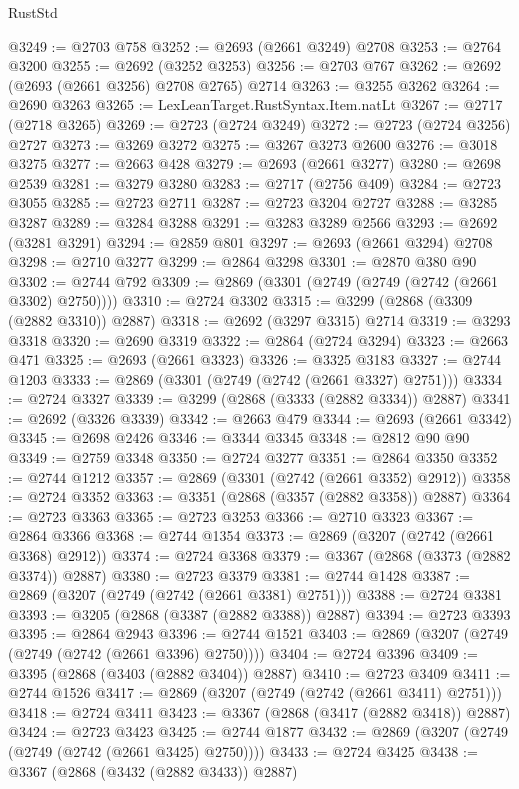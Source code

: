 \begin{lexlean}{RustStd}
\begin{coremodule}
{\begin{coremodule}
{{{{{{{{{{{{{{{{{{{{{{{{{{{{{{{{{{{{{{{@3249 := @2703 @758
@3252 := @2693 (@2661 @3249) @2708
@3253 := @2764 @3200
@3255 := @2692 (@3252 @3253)
@3256 := @2703 @767
@3262 := @2692 (@2693 (@2661 @3256) @2708 @2765) @2714
@3263 := @3255 @3262
@3264 := @2690 @3263
@3265 := LexLeanTarget.RustSyntax.Item.natLt
@3267 := @2717 (@2718 @3265)
@3269 := @2723 (@2724 @3249)
@3272 := @2723 (@2724 @3256) @2727
@3273 := @3269 @3272
@3275 := @3267 @3273 @2600
@3276 := @3018 @3275
@3277 := @2663 @428
@3279 := @2693 (@2661 @3277)
@3280 := @2698 @2539
@3281 := @3279 @3280
@3283 := @2717 (@2756 @409)
@3284 := @2723 @3055
@3285 := @2723 @2711
@3287 := @2723 @3204 @2727
@3288 := @3285 @3287
@3289 := @3284 @3288
@3291 := @3283 @3289 @2566
@3293 := @2692 (@3281 @3291)
@3294 := @2859 @801
@3297 := @2693 (@2661 @3294) @2708
@3298 := @2710 @3277
@3299 := @2864 @3298
@3301 := @2870 @380 @90
@3302 := @2744 @792
@3309 := @2869 (@3301 (@2749 (@2749 (@2742 (@2661 @3302) @2750))))
@3310 := @2724 @3302
@3315 := @3299 (@2868 (@3309 (@2882 @3310)) @2887)
@3318 := @2692 (@3297 @3315) @2714
@3319 := @3293 @3318
@3320 := @2690 @3319
@3322 := @2864 (@2724 @3294)
@3323 := @2663 @471
@3325 := @2693 (@2661 @3323)
@3326 := @3325 @3183
@3327 := @2744 @1203
@3333 := @2869 (@3301 (@2749 (@2742 (@2661 @3327) @2751)))
@3334 := @2724 @3327
@3339 := @3299 (@2868 (@3333 (@2882 @3334)) @2887)
@3341 := @2692 (@3326 @3339)
@3342 := @2663 @479
@3344 := @2693 (@2661 @3342)
@3345 := @2698 @2426
@3346 := @3344 @3345
@3348 := @2812 @90 @90
@3349 := @2759 @3348
@3350 := @2724 @3277
@3351 := @2864 @3350
@3352 := @2744 @1212
@3357 := @2869 (@3301 (@2742 (@2661 @3352) @2912))
@3358 := @2724 @3352
@3363 := @3351 (@2868 (@3357 (@2882 @3358)) @2887)
@3364 := @2723 @3363
@3365 := @2723 @3253
@3366 := @2710 @3323
@3367 := @2864 @3366
@3368 := @2744 @1354
@3373 := @2869 (@3207 (@2742 (@2661 @3368) @2912))
@3374 := @2724 @3368
@3379 := @3367 (@2868 (@3373 (@2882 @3374)) @2887)
@3380 := @2723 @3379
@3381 := @2744 @1428
@3387 := @2869 (@3207 (@2749 (@2742 (@2661 @3381) @2751)))
@3388 := @2724 @3381
@3393 := @3205 (@2868 (@3387 (@2882 @3388)) @2887)
@3394 := @2723 @3393
@3395 := @2864 @2943
@3396 := @2744 @1521
@3403 := @2869 (@3207 (@2749 (@2749 (@2742 (@2661 @3396) @2750))))
@3404 := @2724 @3396
@3409 := @3395 (@2868 (@3403 (@2882 @3404)) @2887)
@3410 := @2723 @3409
@3411 := @2744 @1526
@3417 := @2869 (@3207 (@2749 (@2742 (@2661 @3411) @2751)))
@3418 := @2724 @3411
@3423 := @3367 (@2868 (@3417 (@2882 @3418)) @2887)
@3424 := @2723 @3423
@3425 := @2744 @1877
@3432 := @2869 (@3207 (@2749 (@2749 (@2742 (@2661 @3425) @2750))))
@3433 := @2724 @3425
@3438 := @3367 (@2868 (@3432 (@2882 @3433)) @2887)
}}}}}}}}}}}}}}}}}}}}}}}}}}}}}}}}}}}}}}}
\end{coremodule}}
\end{coremodule}
\end{lexlean}
